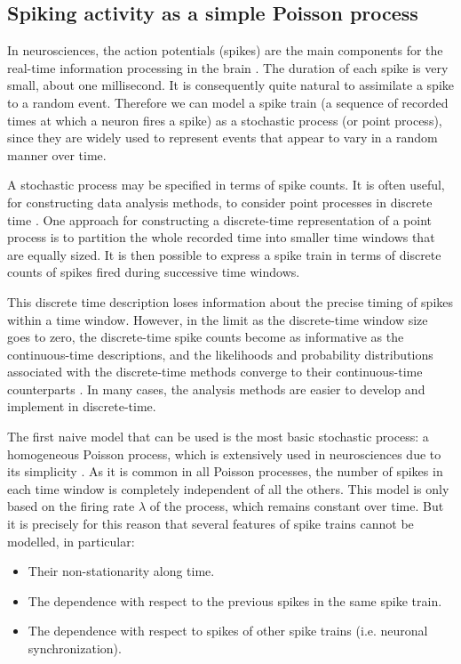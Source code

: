 \documentclass{article}
\begin{document}
\subsection{Spiking activity as a simple Poisson process}

In neurosciences, the action potentials (spikes) are the main components for the real-time information processing in the brain \citep{Eden}. 
The duration of each spike is very small, about one millisecond. 
It is consequently quite natural to assimilate a spike to a random event. 
Therefore we can model a spike train (a sequence of recorded times at which a neuron fires a spike) as a stochastic process (or point process), since they are widely used to represent events that appear to vary in a random manner over time.

A stochastic process may be specified in terms of spike counts. 
It is often useful, for constructing data analysis methods, to consider point processes in discrete time \citep{Eden}. 
One approach for constructing a discrete-time representation of a point process is to partition the whole recorded time into smaller time windows that are equally sized. 
It is then possible to express a spike train in terms of discrete counts of spikes fired during successive time windows. 

This discrete time description loses information about the precise timing of spikes within a time window. 
However, in the limit as the discrete-time window size goes to zero, the discrete-time spike counts become as informative as the continuous-time descriptions, and the likelihoods and probability distributions associated with the discrete-time methods converge to their continuous-time counterparts \citep{Eden}. 
In many cases, the analysis methods are easier to develop and implement in discrete-time.    

The first naive model that can be used is the most basic stochastic process: a homogeneous Poisson process, which is extensively used in neurosciences due to its simplicity \citep{Gerstner}. 
As it is common in all Poisson processes, the number of spikes in each time window is completely independent of all the others. 
This model is only based on the firing rate \begin{math}\lambda\end{math} of the process, which remains constant over time. 
But it is precisely for this reason that several features of spike trains cannot be modelled, in particular: 

\begin{itemize}
    \item Their non-stationarity along time.
    \item The dependence with respect to the previous spikes in the same spike train.
    \item The dependence with respect to spikes of other spike trains (i.e. neuronal synchronization).
\end{itemize}
\end{document}
